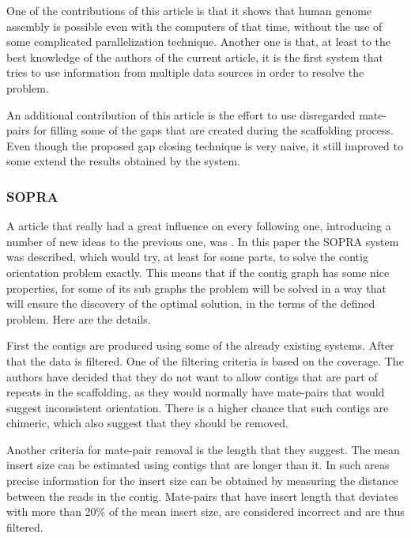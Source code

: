 \documentclass[11pt]{article}
\begin{document}
One of the contributions of this article is that it shows that human genome
assembly is possible even with the computers of that time, without the use of
some complicated parallelization technique. Another one is that, at least to the
best knowledge of the authors of the current article, it is the first system
that tries to use information from multiple data sources in order to resolve the
problem.

An additional contribution of this article is the effort to use disregarded
mate-pairs for filling some of the gaps that are created during the scaffolding
process. Even though the proposed gap closing technique is very naive, it still
improved to some extend the results obtained by the system.

\subsubsection{SOPRA} %
\label{ssub:SOPRA}
A article that really had a great influence on every following one, introducing
a number of new ideas to the previous one, was \cite{SOPRA}. In this paper the
SOPRA system was described, which would try, at least for some parts, to solve
the contig orientation problem exactly. This means that if the contig graph has
some nice properties, for some of its sub graphs the problem will be solved in a
way that will ensure the discovery of the optimal solution, in the terms of the
defined problem. Here are the details.

First the contigs are produced using some of the already existing systems. After
that the data is filtered. One of the filtering criteria is based on the
coverage. The authors have decided that they do not want to allow contigs that
are part of repeats in the scaffolding, as they would normally have mate-pairs
that would suggest inconsistent orientation. There is a higher chance that such
contigs are chimeric, which also suggest that they should be removed.

Another criteria for mate-pair removal is the length that they suggest. The
mean insert size can be estimated using contigs that are longer than it. In such
areas precise information for the insert size can be obtained by measuring the
distance between the reads in the contig. Mate-pairs that have insert length
that deviates with more than 20\% of the mean insert size, are considered
incorrect and are thus filtered.
\end{document}
